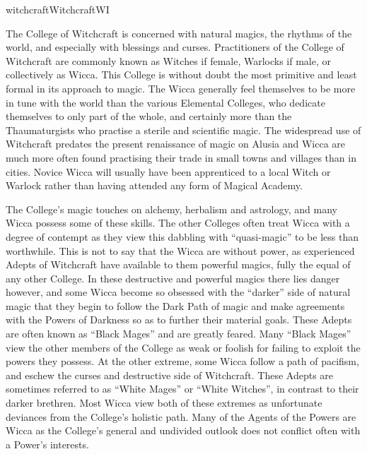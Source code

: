 \begin{College}[1.1]{witchcraft}{Witchcraft}{WI}

The College of Witchcraft is concerned with natural magics, the
rhythms of the world, and especially with blessings and curses.
Practitioners of the College of Witchcraft are commonly known as
Witches if female, Warlocks if male, or collectively as Wicca. This
College is without doubt the most primitive and least formal in its
approach to magic.  The Wicca generally feel themselves to be more in
tune with the world than the various Elemental Colleges, who dedicate
themselves to only part of the whole, and certainly more than the
Thaumaturgists who practise a sterile and scientific magic.  The
widespread use of Witchcraft predates the present renaissance of magic
on Alusia and Wicca are much more often found practising their trade
in small towns and villages than in cities.  Novice Wicca will usually
have been apprenticed to a local Witch or Warlock rather than having
attended any form of Magical Academy.

The College’s magic touches on alchemy, herbalism and astrology, and
many Wicca possess some of these skills.  The other Colleges often
treat Wicca with a degree of contempt as they view this dabbling with
“quasi-magic” to be less than worthwhile.  This is not to say that the
Wicca are without power, as experienced Adepts of Witchcraft have
available to them powerful magics, fully the equal of any other
College. In these destructive and powerful magics there lies danger
however, and some Wicca become so obsessed with the “darker” side of
natural magic that they begin to follow the Dark Path of magic and
make agreements with the Powers of Darkness so as to further their
material goals. These Adepts are often known as “Black Mages” and are
greatly feared.  Many “Black Mages” view the other members of the
College as weak or foolish for failing to exploit the powers they
possess.  At the other extreme, some Wicca follow a path of pacifism,
and eschew the curses and destructive side of Witchcraft.  These
Adepts are sometimes referred to as “White Mages” or “White Witches”,
in contrast to their darker brethren.  Most Wicca view both of these
extremes as unfortunate deviances from the College’s holistic path.
Many of the Agents of the Powers are Wicca as the College’s general
and undivided outlook does not conflict often with a Power’s
interests.


\end{College}
